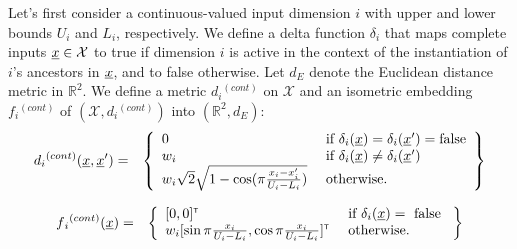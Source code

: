 \documentclass[letterpaper]{article}
\newcommand{\vect}[1]{\underline{\smash{#1}}}
\renewcommand{\v}[1]{\vect{#1}}
\newcommand{\reals}{\mathds{R}}
\newcommand\transpose{{\textrm{\tiny{\sf{T}}}}}
\begin{document}
Let's first consider a continuous-valued input dimension $i$ with upper and lower bounds $U_i$ and $L_i$, respectively. We define a delta function $\delta_i$ that maps complete inputs $\v{x} \in \mathcal{X}$ to true if dimension $i$ is active in the context of the instantiation of $i$'s ancestors in $\v{x}$, and to false otherwise. Let $d{_E}$ denote the Euclidean distance metric in $\reals^{2}$. We define a metric $d{_i}^{(cont)}$ on $\mathcal{X}$ and an isometric embedding $f{_i}^{(cont)}$ of $(\mathcal{X}, d{_i}^{(cont)})$ into $(\reals^{2},d_E)$:
\begin{eqnarray}
\nonumber{}d{_i}^{(cont)}(\v{x}, \v{x}') & = & \left\{\begin{array}{ll}
\nonumber{} 0 & \textrm{ if } \delta_i(\v{x}) = \delta_i(\v{x}') = \textrm{false}\\
\nonumber{} w_i & \textrm{ if } \delta_i(\v{x}) \neq \delta_i(\v{x}')\\
\nonumber{} w_i \sqrt{2} \sqrt{1 - \cos(\pi \frac{x_i-x_i'}{U_i-L_i})} & \textrm{ otherwise. }\end{array}\right\}
\end{eqnarray}

\begin{eqnarray}
\nonumber{}f{_i}^{(cont)}(\v{x}) & = & \left\{\begin{array}{ll}
[0,0]^\transpose & \textrm{ if } \delta_i(\v{x}) = \textrm{ false }\\
\nonumber{} w_i [\sin{\pi\frac{x_i}{U_i-L_i}}, \cos{\pi\frac{x_i}{U_i-L_i}}]^\transpose & \textrm{ otherwise.}\end{array}\right\}
\end{eqnarray}
\end{document}
